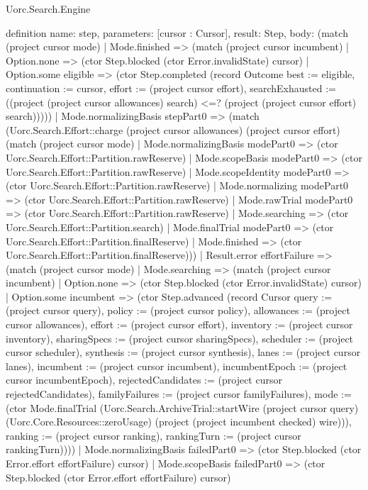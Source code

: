 \begin{lexlean}{Uorc.Search.Engine}
\begin{semanticmodule}
definition{
  name: step,
  parameters: [cursor : Cursor],
  result: Step,
  body: (match (project cursor mode)
    | Mode.finished => (match (project cursor incumbent)
      | Option.none => (ctor Step.blocked (ctor Error.invalidState) cursor)
      | Option.some eligible => (ctor Step.completed (record Outcome {best := eligible, continuation := cursor, effort := (project cursor effort), searchExhausted := ((project (project cursor allowances) search) <=? (project (project cursor effort) search))})))
    | Mode.normalizingBasis stepPart0 => (match (Uorc.Search.Effort::charge (project cursor allowances) (project cursor effort) (match (project cursor mode)
        | Mode.normalizingBasis modePart0 => (ctor Uorc.Search.Effort::Partition.rawReserve)
        | Mode.scopeBasis modePart0 => (ctor Uorc.Search.Effort::Partition.rawReserve)
        | Mode.scopeIdentity modePart0 => (ctor Uorc.Search.Effort::Partition.rawReserve)
        | Mode.normalizing modePart0 => (ctor Uorc.Search.Effort::Partition.rawReserve)
        | Mode.rawTrial modePart0 => (ctor Uorc.Search.Effort::Partition.rawReserve)
        | Mode.searching => (ctor Uorc.Search.Effort::Partition.search)
        | Mode.finalTrial modePart0 => (ctor Uorc.Search.Effort::Partition.finalReserve)
        | Mode.finished => (ctor Uorc.Search.Effort::Partition.finalReserve)))
      | Result.error effortFailure => (match (project cursor mode)
        | Mode.searching => (match (project cursor incumbent)
          | Option.none => (ctor Step.blocked (ctor Error.invalidState) cursor)
          | Option.some incumbent => (ctor Step.advanced (record Cursor {query := (project cursor query), policy := (project cursor policy), allowances := (project cursor allowances), effort := (project cursor effort), inventory := (project cursor inventory), sharingSpecs := (project cursor sharingSpecs), scheduler := (project cursor scheduler), synthesis := (project cursor synthesis), lanes := (project cursor lanes), incumbent := (project cursor incumbent), incumbentEpoch := (project cursor incumbentEpoch), rejectedCandidates := (project cursor rejectedCandidates), familyFailures := (project cursor familyFailures), mode := (ctor Mode.finalTrial (Uorc.Search.ArchiveTrial::startWire (project cursor query) (Uorc.Core.Resources::zeroUsage) (project (project incumbent checked) wire))), ranking := (project cursor ranking), rankingTurn := (project cursor rankingTurn)})))
        | Mode.normalizingBasis failedPart0 => (ctor Step.blocked (ctor Error.effort effortFailure) cursor)
        | Mode.scopeBasis failedPart0 => (ctor Step.blocked (ctor Error.effort effortFailure) cursor)
}
\end{semanticmodule}
\end{lexlean}
